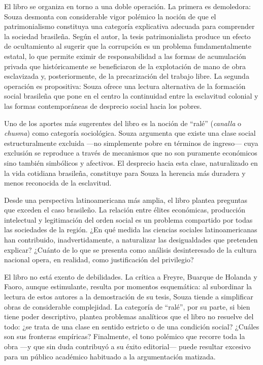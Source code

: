 El libro se organiza en torno a una doble operación. La primera es demoledora: Souza desmonta con considerable vigor polémico la noción de que el patrimonialismo constituya una categoría explicativa adecuada para comprender la sociedad brasileña. Según el autor, la tesis patrimonialista produce un efecto de ocultamiento al sugerir que la corrupción es un problema fundamentalmente estatal, lo que permite eximir de responsabilidad a las formas de acumulación privada que históricamente se beneficiaron de la explotación de mano de obra esclavizada y, posteriormente, de la precarización del trabajo libre. La segunda operación es propositiva: Souza ofrece una lectura alternativa de la formación social brasileña que pone en el centro la continuidad entre la esclavitud colonial y las formas contemporáneas de desprecio social hacia los pobres.

Uno de los aportes más sugerentes del libro es la noción de “ralé” (\textit{canalla} o \textit{chusma}) como categoría sociológica. Souza argumenta que existe una clase social estructuralmente excluida —no simplemente pobre en términos de ingreso— cuya exclusión se reproduce a través de mecanismos que no son puramente económicos sino también simbólicos y afectivos. El desprecio hacia esta clase, naturalizado en la vida cotidiana brasileña, constituye para Souza la herencia más duradera y menos reconocida de la esclavitud.

Desde una perspectiva latinoamericana más amplia, el libro plantea preguntas que exceden el caso brasileño. La relación entre élites económicas, producción intelectual y legitimación del orden social es un problema compartido por todas las sociedades de la región. ¿En qué medida las ciencias sociales latinoamericanas han contribuido, inadvertidamente, a naturalizar las desigualdades que pretenden explicar? ¿Cuánto de lo que se presenta como análisis desinteresado de la cultura nacional opera, en realidad, como justificación del privilegio?

El libro no está exento de debilidades. La crítica a Freyre, Buarque de Holanda y Faoro, aunque estimulante, resulta por momentos esquemática: al subordinar la lectura de estos autores a la demostración de su tesis, Souza tiende a simplificar obras de considerable complejidad. La categoría de “ralé”, por su parte, si bien tiene poder descriptivo, plantea problemas analíticos que el libro no resuelve del todo: ¿se trata de una clase en sentido estricto o de una condición social? ¿Cuáles son sus fronteras empíricas? Finalmente, el tono polémico que recorre toda la obra —y que sin duda contribuyó a su éxito editorial— puede resultar excesivo para un público académico habituado a la argumentación matizada.


